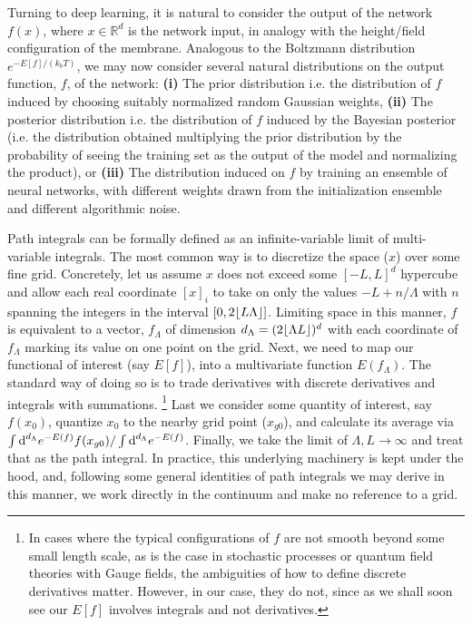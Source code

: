 Turning to deep learning, it is natural to consider the output of the network $f({x})$, where ${x\in \mathbb{R}^d}$ is the network input, in analogy with the height/field configuration of the membrane. Analogous to the Boltzmann distribution $e^{-E[f]/(k_bT)}$, we may now consider several natural distributions on the output function, $f$, of the network: {\bf (i)} The prior distribution i.e. the distribution of $f$ induced by choosing suitably normalized random Gaussian weights, {\bf (ii)} The posterior distribution i.e. the distribution of $f$ induced by the Bayesian posterior (i.e. the distribution obtained multiplying the prior distribution by the probability of seeing the training set as the output of the model and normalizing the product), or {\bf (iii)} The distribution induced on $f$ by training an ensemble of neural networks, with different weights drawn from the initialization ensemble and different algorithmic noise. 

Path integrals can be formally defined as an infinite-variable limit of multi-variable integrals. The most common way is to discretize the space (${x}$) over some fine grid. Concretely, let us assume ${x}$ does not exceed some $[-L,L]^d$ hypercube and allow each real coordinate $[{x}]_i$ to take on only the values $-L + n/\Lambda$ with $n$ spanning the integers in the interval $[0,2 \floor*{L \Lambda}]$. Limiting space in this manner, $f$ is equivalent to a vector, $f_{\Lambda}$ of dimension $d_{\Lambda}=(2 \floor*{\Lambda L})^d$ with each coordinate of $f_{\Lambda}$ marking its value on one point on the grid. Next, we need to map our functional of interest (say $E[f]$), into a multivariate function $E(f_{\Lambda})$. The standard way of doing so is to trade derivatives with discrete derivatives and integrals with summations. \footnote{In cases where the typical configurations of $f$ are not smooth beyond some small length scale, as is the case in stochastic processes or quantum field theories with Gauge fields, the ambiguities of how to define discrete derivatives matter. However, in our case, they do not, since as we shall soon see our $E[f]$ involves integrals and not derivatives.} Last we consider some quantity of interest, say $f({x}_0)$, quantize ${x}_0$ to the nearby grid point (${x}_{g0}$), and calculate its average via $\int \text{d}^{d_{\Lambda}} e^{-E(f)} f({x}_{g0})/\int \text{d}^{d_{\Lambda}} e^{-E(f)}$. Finally, we take the limit of $\Lambda,L \rightarrow \infty$ and treat that as the path integral. In practice, this underlying machinery is kept under the hood, and, following some general identities of path integrals we may derive in this manner, we work directly in the continuum and make no reference to a grid. 

